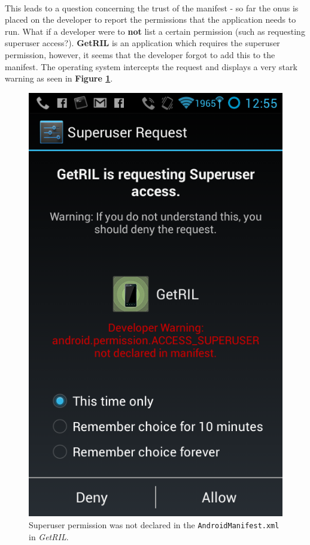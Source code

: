 \documentclass[a4paper]{article}
\begin{document}
\\
\noindent This leads to a question concerning the trust of the manifest - so
far the onus is placed on the developer to report the permissions that the application needs to run. What if a developer
were to \textbf{not} list a certain permission (such as requesting superuser
access?). \textbf{GetRIL} is an application which requires the superuser
permission, however, it seems that the developer forgot to add this to the
manifest. The operating system intercepts the request and displays a very stark
warning as seen in \textbf{Figure \ref{fig:not_declared_in_manifest}}. 
\\
\begin{figure}[htb]
\centering
\includegraphics[scale=0.4, bb=0 0 480
800]{img/not_declared_in_manifest.png}
\caption{Superuser permission was not declared in the
\texttt{AndroidManifest.xml} in \emph{GetRIL}.}
\label{fig:not_declared_in_manifest}
\end{figure} 
\end{document}
